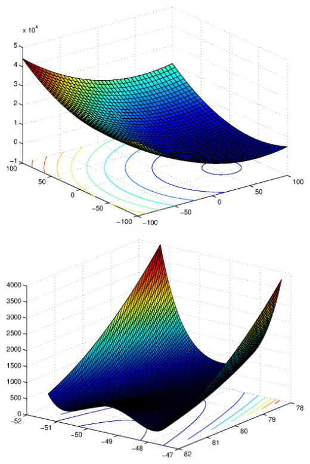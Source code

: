 \documentclass{csfourzero}
\newenvironment{Figure}
  {\par\medskip\noindent\minipage{\linewidth}}
  {\endminipage\par\medskip}
\begin{document}
\begin{multicols}{2}

\begin{Figure}
  \centering
  \includegraphics[width=\linewidth]{../functions/sphere_shifted.eps}
\end{Figure}

\begin{Figure}
  \centering
  \includegraphics[width=\linewidth]{../functions/rosenbrock_shifted.eps}
\end{Figure}


\end{multicols}
\end{document}
